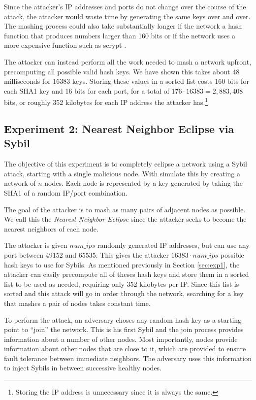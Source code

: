 \documentclass[11pt,conference]{IEEEtran}
\begin{document}
Since the attacker's IP addresses and ports do not change over the course of the attack, the attacker would waste time by generating the same keys over and over. 
The mashing process could also take substantially longer if the network a hash function that produces numbers larger than 160 bits or if the network uses a more expensive function such as scrypt \cite{scrypt}.

The attacker can instead perform all the work needed to mash a network upfront, precomputing all possible valid hash keys.
We have shown this takes about 48 milliseconds for 16383 keys.
Storing these values in a sorted list costs 160 bits for each SHA1 key and 16 bits for each port, for a total of $176  \cdot 16383 = 2,883,408$ bits, or roughly 352 kilobytes for each IP address the attacker has.\footnote{Storing the IP address is unnecessary since it is always the same.}




\subsection{Experiment 2:  Nearest Neighbor Eclipse via Sybil} %
\label{sec:exp2}
The objective of this experiment is to completely eclipse a network using a Sybil attack, starting with a single malicious node.
With simulate this by creating a network of $n$ nodes.
Each node is represented by a key generated by taking the SHA1 of a random IP/port combination.

The goal of the attacker is to mash as many pairs of adjacent nodes as possible.
We call this the \textit{Nearest Neighbor Eclipse} since the attacker seeks to become the nearest neighbors of each node.

The attacker is given $num\_ips$ randomly generated IP addresses, but can use any port between 49152 and 65535.
This gives the attacker $ 16383 \cdot num\_ips $ possible hash keys to use for Sybils.
As mentioned previously in Section \ref{sec:exp1}, the attacker can easily precompute all of theses hash keys and store them in a sorted list to be used as needed, requiring only 352 kilobytes per IP.
Since this list is sorted and this attack will go in order through the network, searching for a key that mashes a pair of nodes takes constant time.

To perform the attack, an adversary choses any random hash key as a starting point to ``join'' the network.
This is his first Sybil and the join process provides information about a number of other nodes.
Most importantly, nodes provide information about other nodes that are close to it, which are provided to ensure fault tolerance between immediate neighbors.
The adversary uses this information to inject Sybils in between successive healthy nodes.
\end{document}
